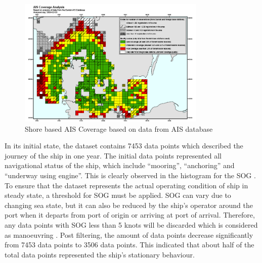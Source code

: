\begin{figure}
    \centering
        \includegraphics[width=0.8\textwidth]{02_figures/AIS_Coverage.png}
        \caption{Shore based AIS Coverage based on data from AIS database \cite{webaisdk.2023}}
        \label{fig:aiscoverage}
\end{figure}

In its initial state, the dataset contains 7453 data points which described the journey of the ship in one year. The initial data points represented all navigational status of the ship, which include ``mooring'', ``anchoring'' and ``underway using engine''. This is clearly observed in the histogram for the SOG .\\ 

To ensure that the dataset represents the actual operating condition of ship in steady state, a threshold for SOG must be applied. SOG can vary due to changing sea state, but it can also be reduced by the ship's operator around the port when it departs from port of origin or arriving at port of arrival. Therefore, any data points with SOG less than 5 knots will be discarded which is considered as manoeuvring . Post filtering, the amount of data points decrease significantly from 7453 data points to 3506 data points. This indicated that about half of the total data points represented the ship's stationary behaviour.\\

